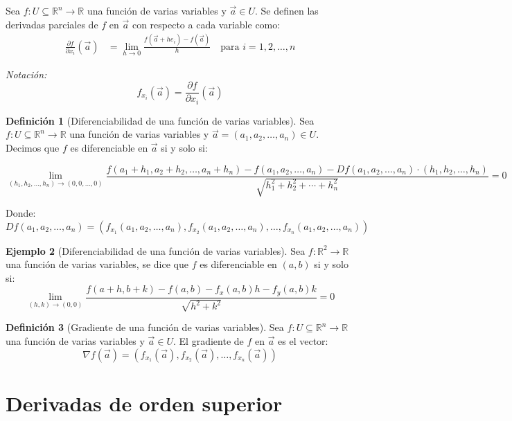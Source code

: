 \documentclass{article}
\newcommand{\R}{\mathbb{R}}
\newcommand{\vect}[1]{\vec{#1}}
\theoremstyle{definition}
\newtheorem{definition}{Definición}[section]
\newtheorem{example}[definition]{Ejemplo}
\theoremstyle{plain}
\theoremstyle{remark}
\theoremstyle{corollary}
\begin{document}
Sea $f : U \subseteq \R^n \to \R$ una función de varias variables y $\vect{a} \in U$.
Se definen las derivadas parciales de $f$ en $\vect{a}$ con respecto a cada variable como:
\begin{align*}
\frac{\partial f}{\partial x_i}(\vect{a}) &= \lim_{h \to 0} \frac{f(\vect{a} + h e_i) - f(\vect{a})}{h} \quad \text{para } i = 1, 2, \ldots, n
\end{align*}

\textit{Notación: }
\[
f_{x_i}(\vect{a}) = \frac{\partial f}{\partial x_i}(\vect{a}) 
\]

\begin{definition}[Diferenciabilidad de una función de varias variables]
Sea $f : U \subseteq \R^n \to \R$ una función de varias variables y $\vect{a} = (a_1, a_2, \ldots, a_n) \in U$. Decimos que $f$ es diferenciable en $\vect{a}$ si y solo si:

\[
\lim_{(h_1, h_2, \ldots, h_n) \to (0, 0, \ldots, 0)} \frac{f(a_1 + h_1, a_2 + h_2, \ldots, a_n + h_n) - f(a_1, a_2, \ldots, a_n) - Df(a_1, a_2, \ldots, a_n) \cdot (h_1, h_2, \ldots, h_n)}{\sqrt{h_1^2 + h_2^2 + \cdots + h_n^2}} = 0
\]

Donde:
\[
Df(a_1, a_2, \ldots, a_n) = \left(f_{x_1}(a_1, a_2, \ldots, a_n), f_{x_2}(a_1, a_2, \ldots, a_n), \ldots, f_{x_n}(a_1, a_2, \ldots, a_n)\right)
\]

\end{definition}

\begin{example}[Diferenciabilidad de una función de varias variables]
Sea $f : \R^2 \to \R$ una función de varias variables, se dice que $f$ es diferenciable en $(a, b)$ si y solo si:
\[
\lim_{(h, k) \to (0, 0)} \frac{f(a + h, b + k) - f(a, b) - f_x(a, b) h - f_y(a, b) k}{\sqrt{h^2 + k^2}} = 0
\]
\end{example}

\begin{definition}[Gradiente de una función de varias variables]
Sea $f : U \subseteq \R^n \to \R$ una función de varias variables y $\vect{a} \in U$. El gradiente de $f$ en $\vect{a}$ es el vector:
\[
\nabla f(\vect{a}) = \left(f_{x_1}(\vect{a}), f_{x_2}(\vect{a}), \ldots, f_{x_n}(\vect{a})\right)
\]
\end{definition}

\section{Derivadas de orden superior}
\end{document}
